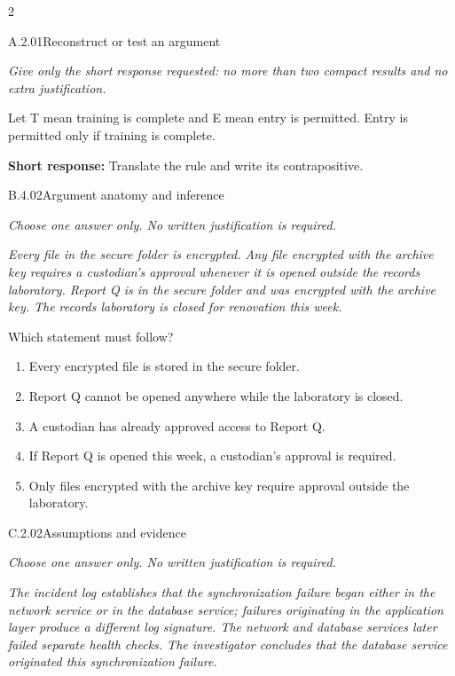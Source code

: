 \documentclass[9pt]{extarticle}
\newcommand{\choice}[1]{\item #1}
\begin{document}
\CoreWorkArea
\FormBreak
{}
\begin{multicols}{2}
\begin{DenseCoreProblem}{A.2.01}{Reconstruct or test an argument}
{\scriptsize\textit{Give only the short response requested: no more than two compact results and no extra justification.}\par}
Let T mean training is complete and E mean entry is permitted. Entry is permitted only if training is complete.

\textbf{Short response:} Translate the rule and write its contrapositive.
\end{DenseCoreProblem}
\begin{DenseCoreProblem}{B.4.02}{Argument anatomy and inference}
{\scriptsize\textit{Choose one answer only. No written justification is required.}\par}
\emph{Every file in the secure folder is encrypted. Any file encrypted with the archive key requires a custodian's approval whenever it is opened outside the records laboratory. Report Q is in the secure folder and was encrypted with the archive key. The records laboratory is closed for renovation this week.}

Which statement must follow?
\begin{enumerate}[label=(\alph*)]
  \choice{Every encrypted file is stored in the secure folder.}
  \choice{Report Q cannot be opened anywhere while the laboratory is closed.}
  \choice{A custodian has already approved access to Report Q.}
  \choice{If Report Q is opened this week, a custodian's approval is required.}
  \choice{Only files encrypted with the archive key require approval outside the laboratory.}
\end{enumerate}
\end{DenseCoreProblem}
\columnbreak
\begin{DenseCoreProblem}{C.2.02}{Assumptions and evidence}
{\scriptsize\textit{Choose one answer only. No written justification is required.}\par}
\emph{The incident log establishes that the synchronization failure began either in the network service or in the database service; failures originating in the application layer produce a different log signature. The network and database services later failed separate health checks. The investigator concludes that the database service originated this synchronization failure.}


\end{DenseCoreProblem}
\end{multicols}
\end{document}
